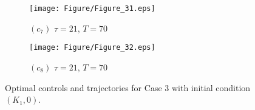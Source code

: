 \documentclass[10pt,letterpaper]{article}
\begin{document}
\begin{figure}[H]
    \begin{subfigure}[t]{0.48\textwidth}
        \centering
        \texttt{[image: Figure/Figure\_31.eps]}
        \par \vspace{1pt} $(c_7)$ $\tau = 21$, $T = 70$
    \end{subfigure}
    \hfill
    \begin{subfigure}[t]{0.48\textwidth}
        \centering
        \texttt{[image: Figure/Figure\_32.eps]}
        \par \vspace{1pt} $(c_8)$ $\tau = 21$, $T = 70$
    \end{subfigure}

    \hspace{1pt}\caption{Optimal controls and trajectories for Case 3 with initial condition $(K_1,0)$.}
    \label{fig:7}
\end{figure}
\end{document}
